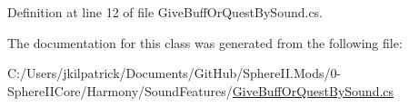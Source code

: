 Definition at line 12 of file Give\+Buff\+Or\+Quest\+By\+Sound.\+cs.



The documentation for this class was generated from the following file\+:\begin{DoxyCompactItemize}
\item 
C\+:/\+Users/jkilpatrick/\+Documents/\+Git\+Hub/\+Sphere\+I\+I.\+Mods/0-\/\+Sphere\+I\+I\+Core/\+Harmony/\+Sound\+Features/\mbox{\hyperlink{_give_buff_or_quest_by_sound_8cs}{Give\+Buff\+Or\+Quest\+By\+Sound.\+cs}}\end{DoxyCompactItemize}
